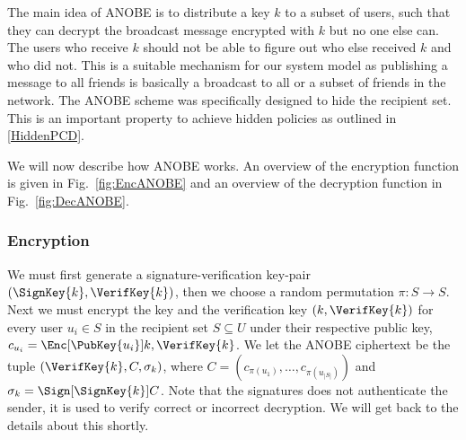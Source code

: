 The main idea of \ac{ANOBE} is to distribute a key \(k\) to a subset of users, 
such that they can decrypt the broadcast message encrypted with \(k\) but no 
one else can.
The users who receive \(k\) should not be able to figure out who else received 
\(k\) and who did not.
This is a suitable mechanism for our system model as publishing a message to 
all friends is basically a broadcast to all or a subset of friends in the 
network.
The \ac{ANOBE} scheme was specifically designed to hide the recipient set.
This is an important property to achieve hidden policies as outlined in 
\cref{HiddenPCD}.

We will now describe how \ac{ANOBE} works.
An overview of the encryption function is given in Fig.~\ref{fig:EncANOBE} and 
an overview of the decryption function in Fig.~\ref{fig:DecANOBE}.

\subsubsection<article>{Encryption}

We must first generate a signature-verification key-pair \((\SignKey{k}, 
  \VerifKey{k})\), then we choose a random permutation \(\pi\colon S\to S\).
Next we must encrypt the key and the verification key \((k, \VerifKey{k})\) for 
every user \(u_i\in S\) in the recipient set \(S\subseteq U\) under their 
respective public key, \(c_{u_i} = \Enc[\PubKey{u_i}]{k, \VerifKey{k}}\).
We let the \ac{ANOBE} ciphertext be the tuple \((\VerifKey{k}, C, \sigma_k)\), 
where
\(C = ( c_{\pi(u_1)}, \ldots, c_{\pi(u_{|S|})})\) and
\(\sigma_k = \Sign[\SignKey{k}]{ C }\).
Note that the signatures does not authenticate the sender, it is used to verify 
correct or incorrect decryption.
We will get back to the details about this shortly.

